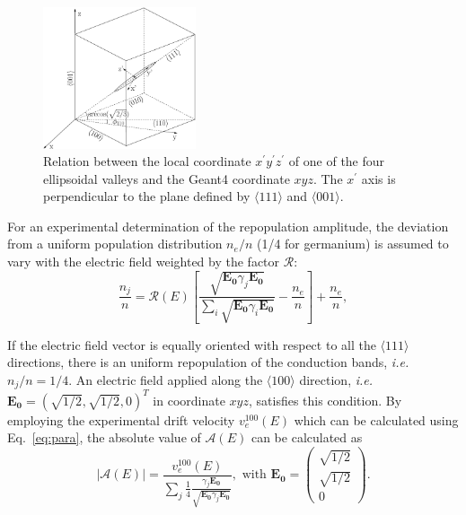 \begin{figure}[tbhp]
  \centering
  \includegraphics[width=0.4\textwidth]{axes}  
  \caption{Relation between the local coordinate     $x^{\prime}y^{\prime}z^{\prime}$ of one of the four ellipsoidal     valleys and the Geant4 coordinate $xyz$. The $x^{\prime}$ axis is     perpendicular to the plane defined by $\langle111\rangle$ and     $\langle001\rangle$.}
  \label{fig:axes}
\end{figure}

For an experimental determination of the repopulation amplitude, the deviation from a uniform population distribution $n_{e}/n$ (1/4 for germanium) is assumed to vary with the electric field weighted by the factor $\mathcal{R}$:
\begin{equation}
  \label{eq:nion}
  \frac{n_{j}}{n} = \mathcal{R}(E)   \left[         \frac{\sqrt{\mathbf{E_{0}}\gamma_{j}\mathbf{E_{0}}}}
    {\sum_{i}\sqrt{\mathbf{E_{0}}\gamma_{i}\mathbf{E_{0}}}} -               \frac{n_{e}}{n} \right] + \frac{n_{e}}{n}, 
\end{equation}

If the electric field vector is equally oriented with respect to all the $\langle111\rangle$ directions, there is an uniform repopulation of the conduction bands, \textit{i.e.} $n_{j}/n = 1/4$. An electric field applied along the $\langle100\rangle$ direction, \textit{i.e.} $\mathbf{E_{0}} = (\sqrt{1/2},\sqrt{1/2},0)^{T}$ in coordinate $xyz$, satisfies this condition. By employing the experimental drift velocity $v_{e}^{100}(E)$ which can be calculated using Eq.~\ref{eq:para}, the absolute value of $\mathcal{A}(E)$ can be calculated as
\begin{equation}
  \label{eq:ae}
  |\mathcal{A}(E)| = \frac{v_{e}^{100}(E)}  {\displaystyle \sum_{j}     \frac{1}{4}     \frac{\gamma_{j}\mathbf{E_{0}}}         {\sqrt{\mathbf{E_{0}}\gamma_{j}\mathbf{E_{0}}}} },  \mbox{ with }       \mathbf{E_{0}} = \left( \begin{array}{c} 
    \sqrt{1/2}\\\sqrt{1/2}\\0 \end{array} \right).
\end{equation}

